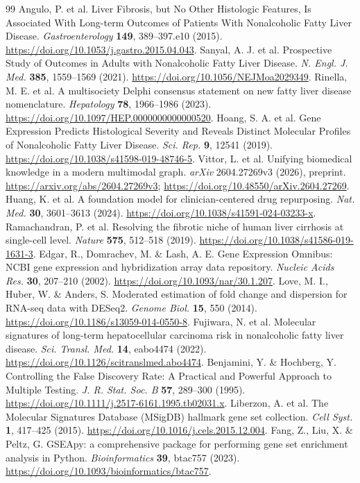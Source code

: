 \documentclass[11pt,a4paper]{article}
\begin{document}
\begin{thebibliography}{99}
 Angulo, P. et al. Liver Fibrosis, but No Other Histologic Features, Is Associated With Long-term Outcomes of Patients With Nonalcoholic Fatty Liver Disease. \textit{Gastroenterology} \textbf{149}, 389–397.e10 (2015). \url{https://doi.org/10.1053/j.gastro.2015.04.043}.
 Sanyal, A. J. et al. Prospective Study of Outcomes in Adults with Nonalcoholic Fatty Liver Disease. \textit{N. Engl. J. Med.} \textbf{385}, 1559–1569 (2021). \url{https://doi.org/10.1056/NEJMoa2029349}.
 Rinella, M. E. et al. A multisociety Delphi consensus statement on new fatty liver disease nomenclature. \textit{Hepatology} \textbf{78}, 1966–1986 (2023). \url{https://doi.org/10.1097/HEP.0000000000000520}.
 Hoang, S. A. et al. Gene Expression Predicts Histological Severity and Reveals Distinct Molecular Profiles of Nonalcoholic Fatty Liver Disease. \textit{Sci. Rep.} \textbf{9}, 12541 (2019). \url{https://doi.org/10.1038/s41598-019-48746-5}.
 Vittor, L. et al. Unifying biomedical knowledge in a modern multimodal graph. \textit{arXiv} 2604.27269v3 (2026), preprint. \url{https://arxiv.org/abs/2604.27269v3}; \url{https://doi.org/10.48550/arXiv.2604.27269}.
 Huang, K. et al. A foundation model for clinician-centered drug repurposing. \textit{Nat. Med.} \textbf{30}, 3601–3613 (2024). \url{https://doi.org/10.1038/s41591-024-03233-x}.
 Ramachandran, P. et al. Resolving the fibrotic niche of human liver cirrhosis at single-cell level. \textit{Nature} \textbf{575}, 512–518 (2019). \url{https://doi.org/10.1038/s41586-019-1631-3}.
 Edgar, R., Domrachev, M. \& Lash, A. E. Gene Expression Omnibus: NCBI gene expression and hybridization array data repository. \textit{Nucleic Acids Res.} \textbf{30}, 207–210 (2002). \url{https://doi.org/10.1093/nar/30.1.207}.
 Love, M. I., Huber, W. \& Anders, S. Moderated estimation of fold change and dispersion for RNA-seq data with DESeq2. \textit{Genome Biol.} \textbf{15}, 550 (2014). \url{https://doi.org/10.1186/s13059-014-0550-8}.
 Fujiwara, N. et al. Molecular signatures of long-term hepatocellular carcinoma risk in nonalcoholic fatty liver disease. \textit{Sci. Transl. Med.} \textbf{14}, eabo4474 (2022). \url{https://doi.org/10.1126/scitranslmed.abo4474}.
 Benjamini, Y. \& Hochberg, Y. Controlling the False Discovery Rate: A Practical and Powerful Approach to Multiple Testing. \textit{J. R. Stat. Soc. B} \textbf{57}, 289–300 (1995). \url{https://doi.org/10.1111/j.2517-6161.1995.tb02031.x}.
 Liberzon, A. et al. The Molecular Signatures Database (MSigDB) hallmark gene set collection. \textit{Cell Syst.} \textbf{1}, 417–425 (2015). \url{https://doi.org/10.1016/j.cels.2015.12.004}.
 Fang, Z., Liu, X. \& Peltz, G. GSEApy: a comprehensive package for performing gene set enrichment analysis in Python. \textit{Bioinformatics} \textbf{39}, btac757 (2023). \url{https://doi.org/10.1093/bioinformatics/btac757}.
\end{thebibliography}
\end{document}
